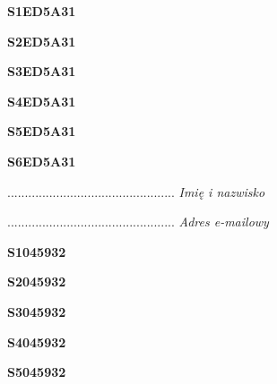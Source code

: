 \begin{turn}{90}\huge \textbf{S1ED5A31}\end{turn}

\begin{turn}{90}\huge \textbf{S2ED5A31}\end{turn}

\begin{turn}{90}\huge \textbf{S3ED5A31}\end{turn}

\begin{turn}{90}\huge \textbf{S4ED5A31}\end{turn}

\begin{turn}{90}\huge \textbf{S5ED5A31}\end{turn}

\begin{turn}{90}\huge \textbf{S6ED5A31}\end{turn}

\begin{turn}{90}\begin{minipage}{\linewidth} \vspace{20mm} ................................................  \textit{Imię i nazwisko}\end{minipage}\end{turn}

\begin{turn}{90}\begin{minipage}{\linewidth} \vspace{20mm} ................................................  \textit{Adres e-mailowy}\end{minipage}\end{turn}

\begin{turn}{90}\huge \textbf{S1045932}\end{turn}

\begin{turn}{90}\huge \textbf{S2045932}\end{turn}

\begin{turn}{90}\huge \textbf{S3045932}\end{turn}

\begin{turn}{90}\huge \textbf{S4045932}\end{turn}

\begin{turn}{90}\huge \textbf{S5045932}\end{turn}

